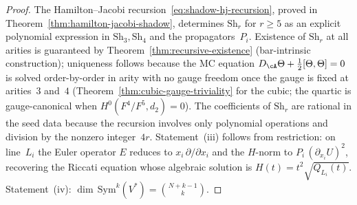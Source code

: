\begin{proof}
The Hamilton--Jacobi
recursion~\eqref{eq:shadow-hj-recursion}, proved in
Theorem~\ref{thm:hamilton-jacobi-shadow},
determines $\mathrm{Sh}_r$ for $r \geq 5$ as an explicit
polynomial expression in $\mathrm{Sh}_3, \mathrm{Sh}_4$
and the propagators~$P_i$.
Existence of $\mathrm{Sh}_r$ at all arities is guaranteed by
Theorem~\ref{thm:recursive-existence}
\textup{(}bar-intrinsic construction\textup{)};
uniqueness follows because the MC equation
$D_\cA \Theta + \frac{1}{2}[\Theta, \Theta] = 0$ is
solved order-by-order in arity with no gauge freedom once
the gauge is fixed at arities~$3$ and~$4$
\textup{(}Theorem~\ref{thm:cubic-gauge-triviality}
for the cubic; the quartic is gauge-canonical when
$H^0(F^4/F^5, d_2) = 0$\textup{)}.
The coefficients of $\mathrm{Sh}_r$ are rational in the seed
data because the recursion involves only polynomial
operations and division by the nonzero
integer~$4r$.
Statement~(iii) follows from restriction:
on line~$L_i$ the Euler operator $E$ reduces to
$x_i\,\partial / \partial x_i$ and the $H$-norm to
$P_i\,(\partial_{x_i} U)^2$, recovering the
Riccati equation whose algebraic solution
is $H(t) = t^2\sqrt{Q_{L_i}(t)}$.
Statement~(iv):
$\dim\,\mathrm{Sym}^k(V^*) = \binom{N+k-1}{k}$.
\end{proof}

